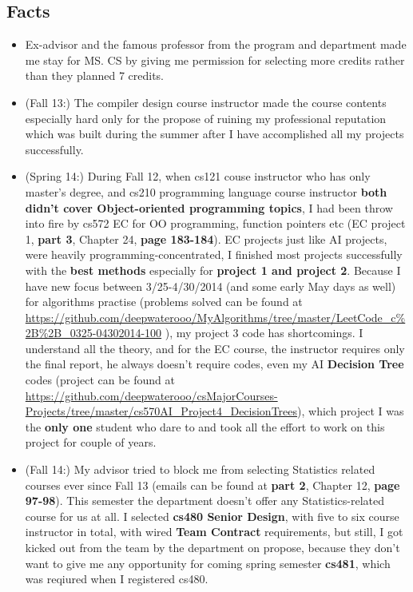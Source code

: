 \documentclass[9pt,b5paper]{article}
\begin{document}
\subsection{Facts}
\label{sec-3-1}
\begin{itemize}
\item Ex-advisor and the famous professor from the program and department made me stay for MS. CS by giving me permission for selecting more credits rather than they planned 7 credits.
\item (Fall 13:) The compiler design course instructor made the course contents especially hard only for the propose of ruining my professional reputation which was built during the summer after I have accomplished all my projects successfully.
\item (Spring 14:) During Fall 12, when cs121 couse instructor who has only master's degree, and cs210 programming language course instructor \textbf{both didn't cover Object-oriented programming topics}, I had been throw into fire by cs572 EC for OO programming, function pointers etc (EC project 1, \textbf{part 3}, Chapter 24, \textbf{page 183-184}). EC projects just like AI projects, were heavily programming-concentrated, I finished most projects successfully with the \textbf{best methods} especially for \textbf{project 1 and project 2}. Because I have new focus between 3/25-4/30/2014 (and some early May days as well) for algorithms practise (problems solved can be found at \url{https://github.com/deepwaterooo/MyAlgorithms/tree/master/LeetCode_c\%2B\%2B_0325-04302014-100} ), my project 3 code has shortcomings. I understand all the theory, and for the EC course, the instructor requires only the final report, he always doesn't require codes, even my AI \textbf{Decision Tree} codes (project can be found at \url{https://github.com/deepwaterooo/csMajorCourses-Projects/tree/master/cs570AI_Project4_DecisionTrees}), which project I was the \textbf{only one} student who dare to and took all the effort to work on this project for couple of years.
\item (Fall 14:) My advisor tried to block me from selecting Statistics related courses ever since Fall 13 (emails can be found at \textbf{part 2}, Chapter 12, \textbf{page 97-98}). This semester the department doesn't offer any Statistics-related course for us at all. I selected \textbf{cs480 Senior Design}, with five to six course instructor in total, with wired \textbf{Team Contract} requirements, but still, I got kicked out from the team by the department on propose, because they don't want to give me any opportunity for coming spring semester \textbf{cs481}, which was reqiured when I registered cs480.

\end{itemize}
\end{document}
